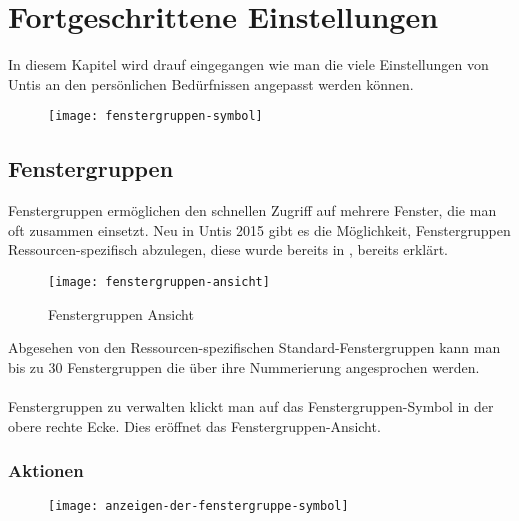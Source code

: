
\chapter{Fortgeschrittene Einstellungen}
\label{chap:advanced-settings}

In diesem Kapitel wird drauf eingegangen wie man die viele Einstellungen von Untis an den persönlichen Bedürfnissen angepasst werden können.

\begin{wrapfigure}{r}{.05\textwidth}
	\vspace{-45pt}
	\texttt{[image: fenstergruppen-symbol]}
	\vspace{-35pt}
\end{wrapfigure}

\section{Fenstergruppen}
\label{sec:fenstergruppen}

Fenstergruppen ermöglichen den schnellen Zugriff auf mehrere Fenster, die man oft zusammen einsetzt. Neu in Untis 2015 gibt es die Möglichkeit, Fenstergruppen Ressourcen-spezifisch abzulegen, diese wurde bereits in , bereits erklärt.\\

\begin{wrapfigure}{r}{.4\textwidth}
	\vspace{-14pt}
	\centering
	\texttt{[image: fenstergruppen-ansicht]}
	\vspace{-5pt}
	\caption{Fenstergruppen Ansicht}
	\label{fig:fenstergruppen-ansicht}
	\vspace{-14pt}
\end{wrapfigure}

\noindent
Abgesehen von den Ressourcen-spezifischen Standard-Fenstergruppen kann man bis zu 30 Fenstergruppen die über ihre Nummerierung angesprochen werden.\\
\\
Fenstergruppen zu verwalten klickt man auf das Fenstergruppen-Symbol in der obere rechte Ecke. Dies eröffnet das Fenstergruppen-Ansicht.

\subsection{Aktionen}

\begin{wrapfigure}{r}{.05\textwidth}
	\vspace{-14pt}
	\texttt{[image: anzeigen-der-fenstergruppe-symbol]}
	\vspace{-35pt}
\end{wrapfigure}

